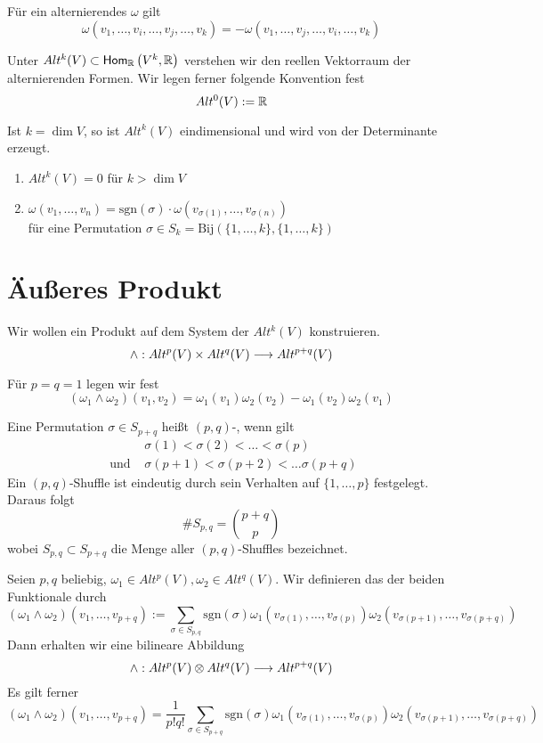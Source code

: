 \Bem{}
Für ein alternierendes $\omega$ gilt
\[ \omega(v_1, \ldots, v_i, \ldots, v_j, \ldots, v_k) = - \omega(v_1,\ldots, v_j, \ldots, v_i, \ldots, v_k) \]

\Def{}
Unter $Alt^k(V) \subset \textsf{Hom}_{\mathbb{R}}\left(V^k, \mathbb{R}\right)$ verstehen wir den reellen Vektorraum der alternierenden Formen. Wir legen ferner folgende Konvention fest
\[ Alt^0(V) := \mathbb{R} \]

\Bsp{}
Ist $k = \dim V$, so ist $Alt^k(V)$ eindimensional und wird von der Determinante erzeugt.

\Lem{}
\begin{enumerate}[1.)]
	\item $Alt^k(V) = 0$ für $k > \dim V$
	\item $\omega(v_1, \ldots, v_n) = \text{sgn}(\sigma) \cdot \omega(v_{\sigma(1)}, \ldots, v_{\sigma(n)})$\\
	für eine Permutation $\sigma \in S_k = \text{Bij}(\{1,\ldots, k\}, \{1,\ldots,k\})$
\end{enumerate}

\section{Äußeres Produkt}
Wir wollen ein Produkt auf dem System der $Alt^k(V)$ konstruieren.
\[ \wedge : Alt^p(V) \times Alt^q(V) \overset{}{\longrightarrow} Alt^{p+q} (V) \]

Für $p = q = 1$ legen wir fest
\[ (\omega_1 \wedge \omega_2) (v_1, v_2) = \omega_1(v_1) \omega_2(v_2) - \omega_1(v_2) \omega_2(v_1) \]

\Def{}
Eine Permutation $\sigma \in S_{p+q}$ heißt $(p,q)$-, wenn gilt
\begin{align*}
& \sigma(1) < \sigma(2) < \ldots < \sigma(p)\\
\text{ und }& \sigma(p+1) < \sigma(p+2) < \ldots \sigma(p+q)
\end{align*}
Ein $(p,q)$-Shuffle ist eindeutig durch sein Verhalten auf $\{1,\ldots, p\}$ festgelegt. Daraus folgt
\[ \# S_{p,q}  = \binom{p+q}{p} \]
wobei $S_{p,q} \subset S_{p+q}$ die Menge aller $(p,q)$-Shuffles bezeichnet.

\Def{}
Seien $p,q$ beliebig, $\omega_1 \in Alt^p(V), \omega_2 \in Alt^q(V)$. Wir definieren das  der beiden Funktionale durch
\[ (\omega_1 \wedge \omega_2) (v_1,\ldots, v_{p+q}) := \sum_{\sigma \in S_{p,q}}\text{sgn}(\sigma) \omega_1(v_{\sigma(1)}, \ldots, v_{\sigma(p)}) \omega_2( v_{\sigma(p+1)}, \ldots, v_{\sigma(p+q)} ) \]
Dann erhalten wir eine bilineare Abbildung
\[ \wedge : Alt^p(V) \otimes Alt^q(V)  \overset{}{\longrightarrow} Alt^{p+q}(V) \]
Es gilt ferner
\[ (\omega_1 \wedge \omega_2) (v_1,\ldots, v_{p+q}) = \frac{1}{p!q!} \sum_{\sigma \in S_{p+q}}\text{sgn}(\sigma) \omega_1(v_{\sigma(1)}, \ldots, v_{\sigma(p)}) \omega_2( v_{\sigma(p+1)}, \ldots, v_{\sigma(p+q)} ) \]

